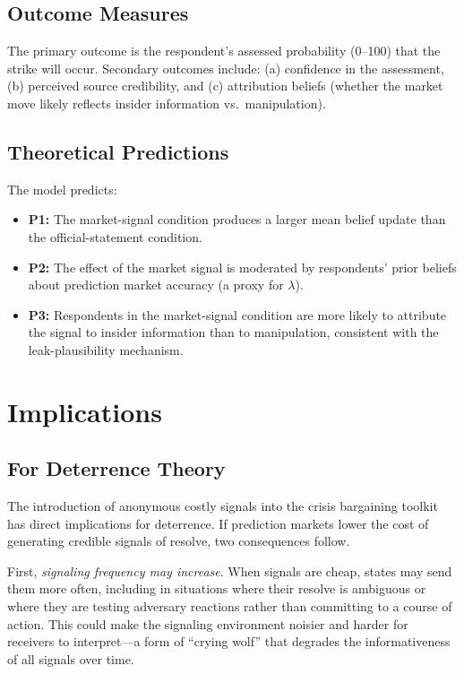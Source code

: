 \documentclass[12pt]{article}
\begin{document}
\subsection{Outcome Measures}

The primary outcome is the respondent's assessed probability (0--100) that the strike will occur. Secondary outcomes include: (a) confidence in the assessment, (b) perceived source credibility, and (c) attribution beliefs (whether the market move likely reflects insider information vs.\ manipulation).

\subsection{Theoretical Predictions}

The model predicts:
\begin{itemize}
    \item \textbf{P1:} The market-signal condition produces a larger mean belief update than the official-statement condition.
    \item \textbf{P2:} The effect of the market signal is moderated by respondents' prior beliefs about prediction market accuracy (a proxy for $\lambda$).
    \item \textbf{P3:} Respondents in the market-signal condition are more likely to attribute the signal to insider information than to manipulation, consistent with the leak-plausibility mechanism.
\end{itemize}


\section{Implications}\label{sec:implications}

\subsection{For Deterrence Theory}

The introduction of anonymous costly signals into the crisis bargaining toolkit has direct implications for deterrence. If prediction markets lower the cost of generating credible signals of resolve, two consequences follow.

First, \textit{signaling frequency may increase}. When signals are cheap, states may send them more often, including in situations where their resolve is ambiguous or where they are testing adversary reactions rather than committing to a course of action. This could make the signaling environment noisier and harder for receivers to interpret---a form of ``crying wolf'' that degrades the informativeness of all signals over time.
\end{document}
